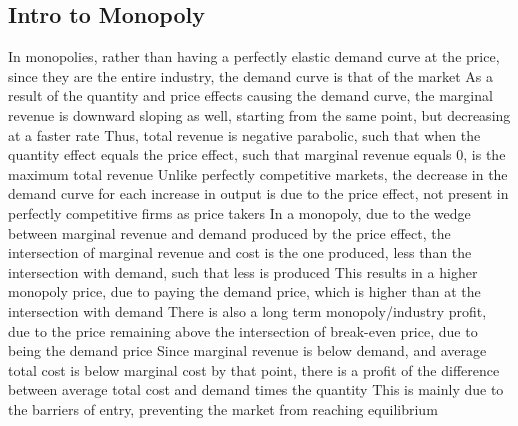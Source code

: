 \documentclass[11 pt, twoside]{article}
\newenvironment{outline*}
{
	\begin{outline}[enumerate]
	}
	{\end{outline}
}
\begin{document}
\subsection{Intro to Monopoly}
\begin{outline*}
\1 In monopolies, rather than having a perfectly elastic demand curve at the price, since they are the entire industry, the demand curve is that of the market
\2 As a result of the quantity and price effects causing the demand curve, the marginal revenue is downward sloping as well, starting from the same point, but decreasing at a faster rate
\2 Thus, total revenue is negative parabolic, such that when the quantity effect equals the price effect, such that marginal revenue equals 0, is the maximum total revenue
\1 Unlike perfectly competitive markets, the decrease in the demand curve for each increase in output is due to the price effect, not present in perfectly competitive firms as price takers
\1 In a monopoly, due to the wedge between marginal revenue and demand produced by the price effect, the intersection of marginal revenue and cost is the one produced, less than the intersection with demand, such that less is produced
\2 This results in a higher monopoly price, due to paying the demand price, which is higher than at the intersection with demand
\2 There is also a long term monopoly/industry profit, due to the price remaining above the intersection of break-even price, due to being the demand price
\3 Since marginal revenue is below demand, and average total cost is below marginal cost by that point, there is a profit of the difference between average total cost and demand times the quantity
\3 This is mainly due to the barriers of entry, preventing the market from reaching equilibrium
\end{outline*}
\end{document}
